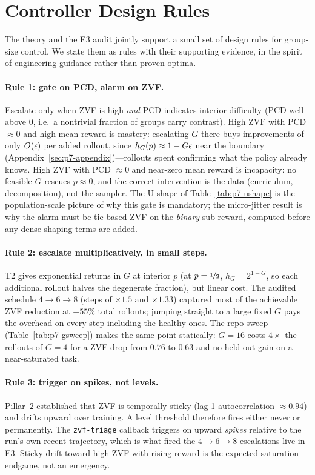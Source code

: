\section{Controller Design Rules}
\label{sec:p7-rules}
The theory and the E3 audit jointly support a small set of design rules for
group-size control. We state them as rules with their supporting evidence,
in the spirit of engineering guidance rather than proven optima.

\paragraph{Rule 1: gate on PCD, alarm on ZVF.} Escalate only when ZVF is
high \emph{and} PCD indicates interior difficulty (PCD well above $0$, i.e.\
a nontrivial fraction of groups carry contrast). High ZVF with PCD
$\approx 0$ and high mean reward is mastery: escalating $G$ there buys
improvements of only $O(\epsilon)$ per added rollout, since
$h_G(p) \approx 1 - G\epsilon$ near the boundary
(Appendix~\ref{sec:p7-appendix})---rollouts spent confirming what the policy
already knows. High ZVF with PCD $\approx 0$ and near-zero mean reward is
incapacity: no feasible $G$ rescues $p \approx 0$, and the correct
intervention is the data (curriculum, decomposition), not the sampler.
The U-shape of Table~\ref{tab:p7-ushape} is the population-scale picture of
why this gate is mandatory; the micro-jitter result is why the alarm must be
tie-based ZVF on the \emph{binary} sub-reward, computed before any dense
shaping terms are added.

\paragraph{Rule 2: escalate multiplicatively, in small steps.} T2 gives
exponential returns in $G$ at interior $p$ (at $p = \nicefrac12$,
$h_G = 2^{1-G}$, so each additional rollout halves the degenerate
fraction), but linear cost. The audited schedule $4 \to 6 \to 8$ (steps of
$\times 1.5$ and $\times 1.33$) captured most of the achievable ZVF
reduction at $+55\%$ total rollouts; jumping straight to a large fixed $G$
pays the overhead on every step including the healthy ones. The repo sweep
(Table~\ref{tab:p7-gsweep}) makes the same point statically: $G{=}16$ costs
$4\times$ the rollouts of $G{=}4$ for a ZVF drop from $0.76$ to $0.63$ and
no held-out gain on a near-saturated task.

\paragraph{Rule 3: trigger on spikes, not levels.} Pillar~2 established
that ZVF is temporally sticky (lag-1 autocorrelation $\approx 0.94$) and
drifts upward over training. A level threshold therefore fires either never
or permanently. The \texttt{zvf-triage} callback triggers on upward
\emph{spikes} relative to the run's own recent trajectory, which is what
fired the $4 \to 6 \to 8$ escalations live in E3. Sticky drift toward high
ZVF with rising reward is the expected saturation endgame, not an
emergency.

